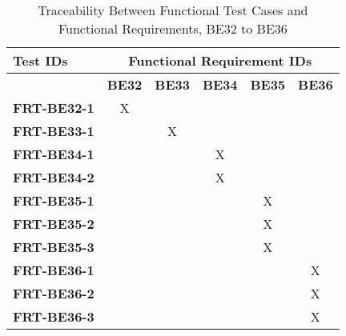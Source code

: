 \documentclass[12pt, titlepage]{article}
\begin{document}
\begin{landscape}
	\begin{longtable}{|l|ccccc|}
		\caption{Traceability Between Functional Test Cases and Functional Requirements, BE32 to BE36}                                                 \\
		\hline
		\textbf{Test IDs}   & \multicolumn{5}{c|}{\textbf{Functional Requirement IDs}}                                                                 \\
		\hline
		~                   & \textbf{BE32}                                            & \textbf{BE33} & \textbf{BE34} & \textbf{BE35} & \textbf{BE36} \\
		\hline
		\textbf{FRT-BE32-1} & X                                                        & ~             & ~             & ~             & ~             \\
		\textbf{FRT-BE33-1} & ~                                                        & X             & ~             & ~             & ~             \\
		\textbf{FRT-BE34-1} & ~                                                        & ~             & X             & ~             & ~             \\
		\textbf{FRT-BE34-2} & ~                                                        & ~             & X             & ~             & ~             \\
		\textbf{FRT-BE35-1} & ~                                                        & ~             & ~             & X             & ~             \\
		\textbf{FRT-BE35-2} & ~                                                        & ~             & ~             & X             & ~             \\
		\textbf{FRT-BE35-3} & ~                                                        & ~             & ~             & X             & ~             \\
		\textbf{FRT-BE36-1} & ~                                                        & ~             & ~             & ~             & X             \\
		\textbf{FRT-BE36-2} & ~                                                        & ~             & ~             & ~             & X             \\
		\textbf{FRT-BE36-3} & ~                                                        & ~             & ~             & ~             & X             \\
		\hline
	\end{longtable}


\end{landscape}
\end{document}
